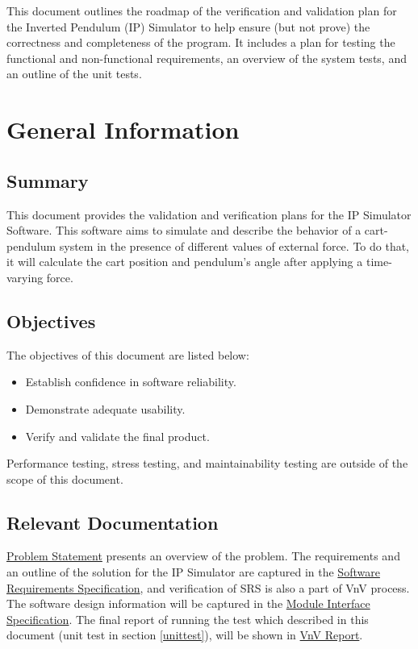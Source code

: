 \documentclass[12pt, titlepage]{article}
\begin{document}

This document outlines the roadmap of the verification and validation plan for the Inverted Pendulum (IP) Simulator to help ensure (but not prove) the correctness and completeness of the program.
It includes a plan for testing the functional and non-functional requirements, an overview of the system tests, and an outline of the unit tests.

\section{General Information}

\subsection{Summary}
This document provides the validation and verification plans for the IP Simulator Software. This software aims to simulate and describe the behavior of a cart-pendulum system in the presence of different values of external force. To do that, it will calculate the cart position and pendulum's angle after applying a time-varying force.
\subsection{Objectives}

The objectives of this document are listed below:
\begin{itemize}
\item Establish confidence in software reliability.
\item Demonstrate adequate usability.
\item Verify and validate the final product.
\end{itemize}
Performance testing, stress testing, and maintainability testing are outside of the scope of this document.
\subsection{Relevant Documentation}

\href{https://github.com/MinMah23/CAS741-Project/tree/main/docs/ProblemStatementAndGoals/ProblemStatement.pdf}{Problem Statement} presents an overview of the problem.
The requirements and an outline of the solution for the IP Simulator are captured in the \href{https://github.com/MinMah23/CAS741-Project/tree/main/docs/SRS/SRS.pdf}{Software Requirements Specification}, and verification of SRS is also a part of VnV process. The software design information will be captured in the \href{https://github.com/MinMah23/CAS741-Project/tree/main/docs/Design}{Module Interface Specification}. The final report of running the test which described in this document (unit test in section \ref{unittest}), will be shown in \href{https://github.com/MinMah23/CAS741-Project/tree/main/docs/VnVReport/VnVReport.pdf}{VnV Report}.
\end{document}
